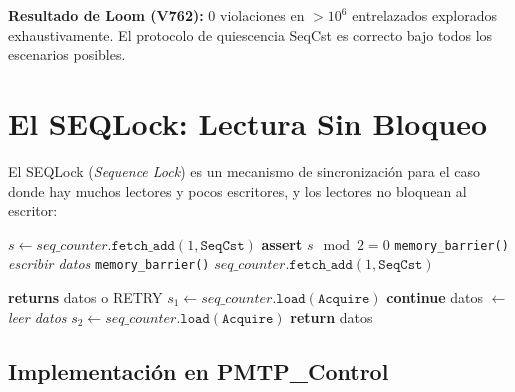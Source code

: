 \begin{certifiedbox}
\textbf{Resultado de Loom (V762):}
$0$ violaciones en $> 10^6$ entrelazados explorados exhaustivamente.
El protocolo de quiescencia SeqCst es correcto bajo todos los escenarios posibles.
\end{certifiedbox}

\section{El SEQLock: Lectura Sin Bloqueo}

El SEQLock (\textit{Sequence Lock}) es un mecanismo de sincronización para el caso
donde hay muchos lectores y pocos escritores, y los lectores no bloquean al escritor:

\begin{algorithm}
\caption{SEQLock --- Escritura}
\begin{algorithmic}[1]
  \State $s \gets seq\_counter.\texttt{fetch\_add}(1, \texttt{SeqCst})$ 
  \State \textbf{assert} $s \mod 2 = 0$ 
  \State \texttt{memory\_barrier()} 
  \State \textit{escribir datos}
  \State \texttt{memory\_barrier()} 
  \State $seq\_counter.\texttt{fetch\_add}(1, \texttt{SeqCst})$ 
\EndProcedure
\end{algorithmic}
\end{algorithm}

\begin{algorithm}
\caption{SEQLock --- Lectura}
\begin{algorithmic}[1]
 \textbf{returns} datos o RETRY
  \Repeat
    \State $s_1 \gets seq\_counter.\texttt{load}(\texttt{Acquire})$
      \State \textbf{continue} 
    \EndIf
    \State datos $\gets$ \textit{leer datos}
    \State $s_2 \gets seq\_counter.\texttt{load}(\texttt{Acquire})$
      \State \textbf{return} datos 
    \EndIf
   
\EndProcedure
\end{algorithmic}
\end{algorithm}

\subsection{Implementación en PMTP\_Control}

